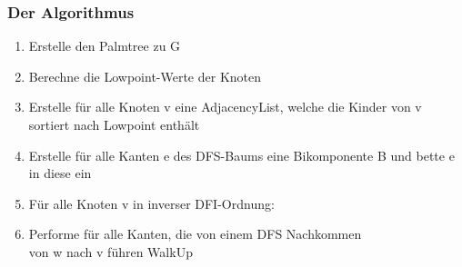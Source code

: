 \documentclass{beamer}
\begin{document}
\begin{frame}
{
        }
        
    \end{frame}

    \begin{frame}
        \frametitle{Der Algorithmus}
        \begin{enumerate}
            \item Erstelle den Palmtree zu G
            \item Berechne die Lowpoint-Werte der Knoten
            \item Erstelle für alle Knoten v eine AdjacencyList, welche die Kinder von v sortiert nach Lowpoint enthält 
            \item Erstelle für alle Kanten e des DFS-Baums eine Bikomponente B und bette e in diese ein
            \item Für alle Knoten v in inverser DFI-Ordnung:
            \item \; Performe für alle Kanten, die von einem DFS Nachkommen \\ \; von w nach v führen WalkUp
        \end{enumerate}
    \end{frame}
\end{document}

